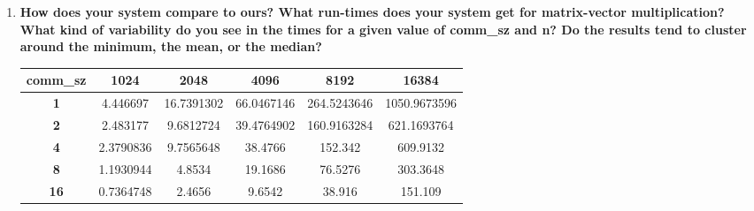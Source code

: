 \documentclass[a4paper,12pt]{article}
\begin{document}
\begin{enumerate}
{\begin{lstlisting}
int MPU_Unpack8
  void*		pack_buf	/*in*/,
  int 		pac_buf_sz	/*in*/,
  int*		position_p	/*in/out*/,
  void*		out_buf		/*out*/,
  int		out_buf_count	/*in*/,
  MPI_Datatype  datatype	/*in*/,
  MPI_Comm	comm		/*in*/);
\end{lstlisting}

\textbf{This can be used by ``reversing'' the steps in MPI\_Pack, that is, the data is unpacked one block
at a time starting with position = 0. Write another Get\_input function for the trapezoidal rule program. This
one should use MPI\_Pack on process 0 and MPI\_Unpack on the other processes.}

}


El código se muestra a continuación:

\begin{lstlisting}
	char pack_buff[BUFF_SIZE];
	int position = 0;
	if(my_rank == 0){
		printf("Enter a, b, and n\n");
		scanf("%lf %lf %d",&a, &b, &n);
		MPI_Pack(&a,1,MPI_DOUBLE,pack_buff,BUFF_SIZE,&position,MPI_COMM_WORLD);
		MPI_Pack(&b,1,MPI_DOUBLE,pack_buff,BUFF_SIZE,&position,MPI_COMM_WORLD);
		MPI_Pack(&n,1,MPI_INT,pack_buff,BUFF_SIZE,&position,MPI_COMM_WORLD);
	}
	MPI_Bcast(pack_buff,BUFF_SIZE,MPI_PACKED,0,MPI_COMM_WORLD);
	if(my_rank != 0){
		MPI_Unpack(pack_buff,BUFF_SIZE,&position,&a,1,MPI_DOUBLE,MPI_COMM_WORLD);
		MPI_Unpack(pack_buff,BUFF_SIZE,&position,&b,1,MPI_DOUBLE,MPI_COMM_WORLD);
		MPI_Unpack(pack_buff,BUFF_SIZE,&position,&n,1,MPI_INT,MPI_COMM_WORLD);
	}
\end{lstlisting}


\item \textbf{How does your system compare to ours? What run-times does your system get for matrix-vector
multiplication? What kind of variability do you see in the times for a given value of comm\_sz and n? Do 
the results tend to cluster around the minimum, the mean, or the median?}

\begin{center}
\begin{tabular}{|c|c|c|c|c|c|}\hline
\textbf{comm\_sz} & \textbf{1024} & \textbf{2048} & \textbf{4096} & \textbf{8192} & \textbf{16384}\\\hline
\textbf{1} & 4.446697 & 16.7391302 & 66.0467146 & 264.5243646 & 1050.9673596\\\hline
\textbf{2} & 2.483177 & 9.6812724 & 39.4764902 & 160.9163284 & 621.1693764\\\hline
\textbf{4} & 2.3790836 & 9.7565648 & 38.4766 & 152.342 & 609.9132\\\hline
\textbf{8} & 1.1930944 & 4.8534 & 19.1686 & 76.5276 & 303.3648\\\hline
\textbf{16} & 0.7364748 & 2.4656 & 9.6542 & 38.916 & 151.109\\\hline
\end{tabular}
\end{center}


\end{enumerate}
\end{document}
